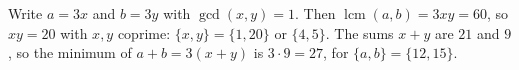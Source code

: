 Write $a=3x$ and $b=3y$ with $\gcd(x,y)=1$. Then $\operatorname{lcm}(a,b)=3xy=60$, so $xy=20$ with $x,y$ coprime: $\{x,y\}=\{1,20\}$ or $\{4,5\}$. The sums $x+y$ are $21$ and $9$, so the minimum of $a+b=3(x+y)$ is $3\cdot9=\boxed{27}$, for $\{a,b\}=\{12,15\}$.
